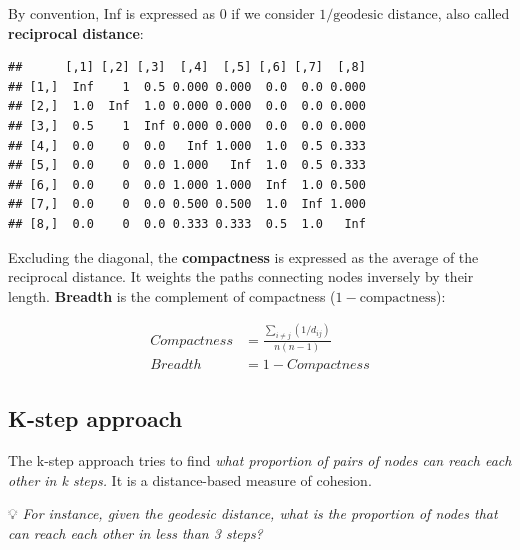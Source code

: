 \documentclass[
  notitlepage,
  onecolumn,
  openany]{book}
\newenvironment{Shaded}{\begin{snugshade}}{\end{snugshade}}
\newcommand{\DecValTok}[1]{\textcolor[rgb]{0.00,0.00,0.81}{#1}}
\newcommand{\FunctionTok}[1]{\textcolor[rgb]{0.00,0.00,0.00}{#1}}
\newcommand{\NormalTok}[1]{#1}
\newcommand{\SpecialCharTok}[1]{\textcolor[rgb]{0.00,0.00,0.00}{#1}}
\begin{document}
By convention, Inf is expressed as 0 if we consider \(1/\text{geodesic distance}\), also called \textbf{reciprocal distance}:

\begin{Shaded}
\end{Shaded}

\begin{verbatim}
##      [,1] [,2] [,3]  [,4]  [,5] [,6] [,7]  [,8]
## [1,]  Inf    1  0.5 0.000 0.000  0.0  0.0 0.000
## [2,]  1.0  Inf  1.0 0.000 0.000  0.0  0.0 0.000
## [3,]  0.5    1  Inf 0.000 0.000  0.0  0.0 0.000
## [4,]  0.0    0  0.0   Inf 1.000  1.0  0.5 0.333
## [5,]  0.0    0  0.0 1.000   Inf  1.0  0.5 0.333
## [6,]  0.0    0  0.0 1.000 1.000  Inf  1.0 0.500
## [7,]  0.0    0  0.0 0.500 0.500  1.0  Inf 1.000
## [8,]  0.0    0  0.0 0.333 0.333  0.5  1.0   Inf
\end{verbatim}

Excluding the diagonal, the \textbf{compactness} is expressed as the average of the reciprocal distance. It weights the paths connecting nodes inversely by their length. \textbf{Breadth} is the complement of compactness (\(1-\text{compactness}\)):

\[
\begin{aligned}
Compactness &= \frac{\sum_{i\neq j} (1/d_{ij})}{n(n-1)}\\
Breadth &= 1-Compactness
\end{aligned}
\]

\hypertarget{k-step-approach}{%
\subsection{K-step approach}\label{k-step-approach}}

The k-step approach tries to find \emph{what proportion of pairs of nodes can reach each other in k steps.} It is a distance-based measure of cohesion.

💡 \emph{For instance, given the geodesic distance, what is the proportion of nodes that can reach each other in less than 3 steps?}
\end{document}
